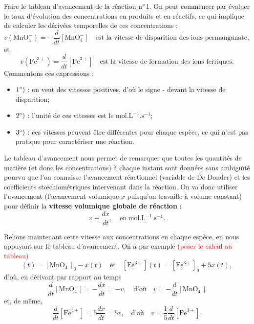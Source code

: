 \documentclass[11pt,a4paper]{report}
\begin{document}
Faire le tableau d'avancement de la réaction n$\degree$1. On peut commencer par évaluer le taux d'évolution des concentrations en produits et en réactifs, ce qui implique de calculer les dérivées temporelles de ces concentrations :
\begin{equation}
	v(\text{MnO}_4^-) = - \frac{d}{dt}[\text{MnO}_4^-] \quad\text{est la vitesse de disparition des ions permanganate},
\end{equation}
et
\begin{equation}
	v(\text{Fe}^{3+}) =  \frac{d}{dt}[\text{Fe}^{3+}] \quad\text{est la vitesse de formation des ions ferriques}.
\end{equation}
Commentons ces expressions :
\begin{itemize}
	\item $1\degree)$ : on veut des vitesses positives, d'où le signe - 
				devant la vitesse de disparition;
	\item $2\degree)$ : l'unité de ces vitesses est le $\text{mol}.\text{L}^{-1}.\text{s}^{-1}$;
	\item $3\degree)$ : ces vitesses peuvent être différentes pour chaque espèce, ce qui n'est pas pratique pour caractériser une réaction.\\
\end{itemize}

Le tableau d'avancement nous permet de remarquer que toutes les quantités de matière (et donc les concentrations) à chaque instant sont données sans ambiguïté pourvu que l'on connaisse l'avancement réactionnel (variable de De Donder) et les coefficients stœchiométriques intervenant dans la réaction. On va donc utiliser l'avancement (l'avancement volumique $x$ puisqu'on travaille à volume constant) pour définir la \textbf{vitesse volumique globale de réaction} :
\begin{equation}
	v \equiv \frac{dx}{dt}, \quad\text{en}\;\text{mol}.\text{L}^{-1}.\text{s}^{-1}.
\end{equation}

Relions maintenant cette vitesse aux concentrations en chaque espèce, en nous appuyant sur le tableau d'avancement. On a par exemple \textcolor{red}{(poser le calcul au tableau)}
\begin{equation}
	[\text{MnO}_4^-](t) = [\text{MnO}_4^-]_0 - x(t) \quad\text{et}\quad
	[\text{Fe}^{3+}](t) = [\text{Fe}^{3+}]_0 + 5x(t),
\end{equation}
d'où, en dérivant par rapport au temps 
\begin{equation}
	\frac{d}{dt}[\text{MnO}_4^-] = -\frac{dx}{dt} = -v, \quad\text{d'où}\quad
	v = -\frac{d}{dt}[\text{MnO}_4^-]
\end{equation}
et, de même,
\begin{equation}
	\frac{d}{dt}[\text{Fe}^{3+}] = 5\frac{dx}{dt} = 5v, \quad\text{d'où}\quad
	v = \frac{1}{5}\frac{d}{dt}[\text{Fe}^{3+}].
\end{equation}
\end{document}
